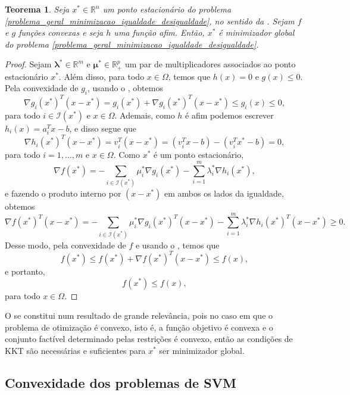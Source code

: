 \documentclass[12pt,a4paper]{scrartcl}
\def\RR{\mathds{R}}
\newtheorem{teo}{Teorema}
\theoremstyle{definition}%
\begin{document}
\begin{teo} \label{teo:pontoestacionario_minimizadorglobal_convexidade}
Seja $x^{*} \in \RR^{n}$ um ponto estacionário do problema \eqref{problema_geral_minimizacao_igualdade_desigualdade}, no sentido da . Sejam $f$ e $g$ funções convexas e seja $h$ uma função afim. Então, $x^{*}$ é minimizador global do problema \eqref{problema_geral_minimizacao_igualdade_desigualdade}.
\end{teo}
\begin{proof}
Sejam $\boldsymbol{\lambda}^{*} \in \RR^{m}$ e $\boldsymbol{\mu}^{*} \in \RR^{p}_{+}$ um par de multiplicadores associados ao ponto estacionário $x^{*}$. Além disso, para todo $x\in \Omega$, temos que $h(x) = 0$ e $g(x) \leq 0$. Pela convexidade de $g_{i}$, usando o , obtemos
\[
\nabla g_{i}(x^{*})^{T} (x - x^{*}) = g_{i}(x^{*}) + \nabla g_{i}(x^{*})^{T}(x - x^{*}) \leq g_{i}(x) \leq 0,
\]
para todo $i \in \mathcal{I}(x^{*})$ e $x\in \Omega$. Ademais, como $h$ é afim podemos escrever $h_{i}(x) = a_{i}^{T}x - b$, e disso segue que
\[
\nabla h_{i}(x^{*})^{T}(x - x^{*}) = v_{i}^{T}(x - x^{*}) = (v_{i}^{T}x - b) - (v_{i}^{T}x^{*} - b) = 0,
\]
para todo $i = 1, \ldots , m$ e $x \in \Omega$. Como $x^{*}$ é um ponto estacionário,
\[
\nabla f(x^{*}) = - \sum_{i\in \mathcal{I}(x^{*})} \mu_{i}^{*} \nabla g_{i}(x^{*}) - \sum_{i=1}^{m} \lambda_{i}^{*} \nabla h_{i}(x^{*}) ,
\]
e fazendo o produto interno por $(x - x^{*})$ em ambos os lados da igualdade, obtemos
\[
\nabla f(x^{*})^{T} (x - x^{*}) = - \sum_{i\in \mathcal{I}(x^{*})} \mu_{i}^{*} \nabla g_{i}(x^{*})^{T} (x - x^{*}) - \sum_{i=1}^{m} \lambda_{i}^{*} \nabla h_{i}(x^{*})^{T} (x - x^{*}) \geq 0.
\]
Desse modo, pela convexidade de $f$ e usando o , temos que
\[
f(x^{*}) \leq f(x^{*}) + \nabla f(x^{*})^{T} (x - x^{*}) \leq f(x),
\]
e portanto,
\[
f(x^{*}) \leq f(x),
\]
para todo $x \in \Omega$.
\end{proof}

O  se constitui num resultado de grande relevância, pois no caso em que o problema de otimização é convexo, isto é, a função objetivo é convexa e o conjunto factível determinado pelas restrições é convexo, então as condições de KKT são necessárias e suficientes para $x^{*}$ ser minimizador global.


\subsection{Convexidade dos problemas de SVM}
\end{document}
